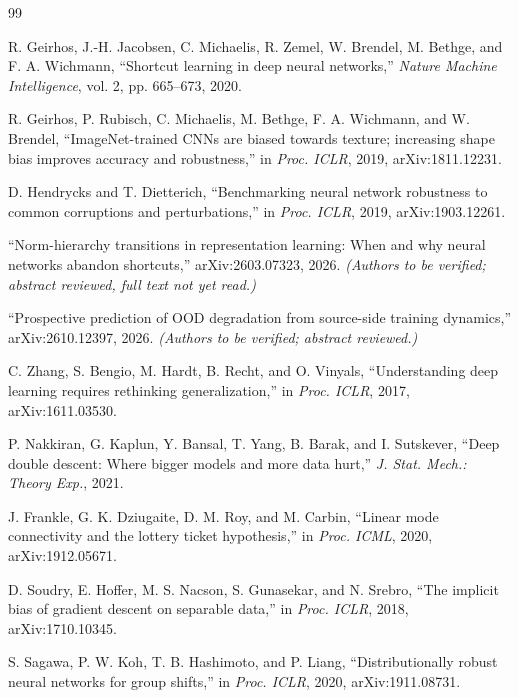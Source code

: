 \documentclass[conference]{IEEEtran}
\begin{document}
\begin{thebibliography}{99}

R. Geirhos, J.-H. Jacobsen, C. Michaelis, R. Zemel, W. Brendel, M. Bethge, and
F. A. Wichmann, ``Shortcut learning in deep neural networks,'' \textit{Nature Machine
Intelligence}, vol. 2, pp. 665--673, 2020.

R. Geirhos, P. Rubisch, C. Michaelis, M. Bethge, F. A. Wichmann, and W. Brendel,
``ImageNet-trained CNNs are biased towards texture; increasing shape bias improves
accuracy and robustness,'' in \textit{Proc. ICLR}, 2019, arXiv:1811.12231.

D. Hendrycks and T. Dietterich, ``Benchmarking neural network robustness to common
corruptions and perturbations,'' in \textit{Proc. ICLR}, 2019, arXiv:1903.12261.

``Norm-hierarchy transitions in representation learning: When and why neural networks
abandon shortcuts,'' arXiv:2603.07323, 2026. \textit{(Authors to be verified; abstract
reviewed, full text not yet read.)}

``Prospective prediction of OOD degradation from source-side training dynamics,''
arXiv:2610.12397, 2026. \textit{(Authors to be verified; abstract reviewed.)}

C. Zhang, S. Bengio, M. Hardt, B. Recht, and O. Vinyals, ``Understanding deep learning
requires rethinking generalization,'' in \textit{Proc. ICLR}, 2017, arXiv:1611.03530.

P. Nakkiran, G. Kaplun, Y. Bansal, T. Yang, B. Barak, and I. Sutskever, ``Deep double
descent: Where bigger models and more data hurt,'' \textit{J. Stat. Mech.: Theory Exp.},
2021.

J. Frankle, G. K. Dziugaite, D. M. Roy, and M. Carbin, ``Linear mode connectivity and the
lottery ticket hypothesis,'' in \textit{Proc. ICML}, 2020, arXiv:1912.05671.

D. Soudry, E. Hoffer, M. S. Nacson, S. Gunasekar, and N. Srebro, ``The implicit bias of
gradient descent on separable data,'' in \textit{Proc. ICLR}, 2018, arXiv:1710.10345.

S. Sagawa, P. W. Koh, T. B. Hashimoto, and P. Liang, ``Distributionally robust neural
networks for group shifts,'' in \textit{Proc. ICLR}, 2020, arXiv:1911.08731.


\end{thebibliography}
\end{document}
